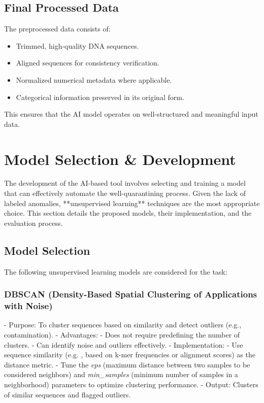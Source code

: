 \subsection{Final Processed Data}
The preprocessed data consists of:

\begin{itemize}
    \item Trimmed, high-quality DNA sequences.
    \item Aligned sequences for consistency verification.
    \item Normalized numerical metadata where applicable.
    \item Categorical information preserved in its original form.
\end{itemize}

This ensures that the AI model operates on well-structured and meaningful input data.

\section{Model Selection \& Development}
\label{sec:model_development}

The development of the AI-based tool involves selecting and training a model that can effectively automate the well-quarantining process. Given the lack of labeled anomalies, **unsupervised learning** techniques are the most appropriate choice. This section details the proposed models, their implementation, and the evaluation process.

\subsection{Model Selection}
The following unsupervised learning models are considered for the task:

\subsubsection{DBSCAN (Density-Based Spatial Clustering of Applications with Noise)}
- Purpose: To cluster sequences based on similarity and detect outliers (e.g., contamination).
- Advantages:
  - Does not require predefining the number of clusters.
  - Can identify noise and outliers effectively.
- Implementation:
  - Use sequence similarity (e.g. , based on k-mer frequencies or alignment scores) as the distance metric.
  - Tune the \textit{eps} (maximum distance between two samples to be considered neighbors) and \textit{min\_samples} (minimum number of samples in a neighborhood) parameters to optimize clustering performance.
- Output: Clusters of similar sequences and flagged outliers.

